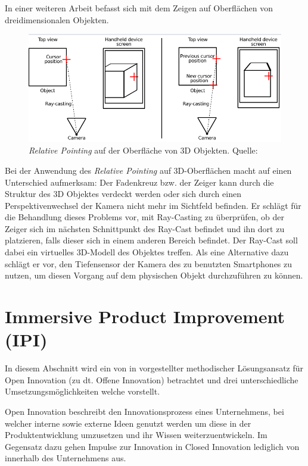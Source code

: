In einer weiteren Arbeit befasst sich \citeauthor{Vincent2014} mit dem Zeigen auf Oberflächen von dreidimensionalen Objekten. \cite[S.~92]{Vincent2014}

\begin{figure}[H]
	\centering
	\includegraphics[width=.7\textwidth]{resources/analyse/pointing_3d.png}
	\caption{\textit{Relative Pointing} auf der Oberfläche von 3D Objekten. Quelle: \cite[S.~84]{Vincent2014}}
	\label{img:pointing_auf3d}
\end{figure}

Bei der Anwendung des \textit{Relative Pointing} auf 3D-Oberflächen macht \citeauthor{Vincent2014} auf einen Unterschied aufmerksam: Der Fadenkreuz bzw. der Zeiger kann durch die Struktur des
3D Objektes verdeckt werden oder sich durch einen Perspektivenwechsel der Kamera nicht mehr im Sichtfeld befinden. Er schlägt für die Behandlung dieses Problems vor, mit Ray-Casting zu überprüfen, 
ob der Zeiger sich im nächsten Schnittpunkt des Ray-Cast befindet und ihn dort zu platzieren, falls dieser sich in einem anderen Bereich befindet. Der Ray-Cast soll dabei ein virtuelles 3D-Modell des Objektes treffen.
Als eine Alternative dazu schlägt er vor, den Tiefensensor der Kamera des zu benutzten Smartphones zu nutzen, um diesen Vorgang auf dem physischen Objekt durchzuführen zu können. \cite[S.~83]{Vincent2014}

\section{Immersive Product Improvement (IPI)} \label{ipi_section}

In diesem Abschnitt wird ein von \citeauthor{Kirschner2012} in \cite{Kirschner2012} vorgestellter methodischer Lösungsansatz für Open Innovation (zu dt. Offene Innovation) betrachtet und 
drei unterschiedliche Umsetzungsmöglichkeiten welche \citeauthor{Kirschner2012} vorstellt. 

Open Innovation beschreibt den Innovationsprozess eines Unternehmens, bei welcher interne sowie externe Ideen genutzt werden um diese in der Produktentwicklung umzusetzen und ihr Wissen weiterzuentwickeln. 
Im Gegensatz dazu gehen Impulse zur Innovation in Closed Innovation  lediglich von innerhalb des Unternehmens aus.\cite[S.~32]{Kirschner2012}

